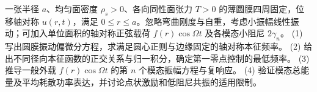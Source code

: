 一张半径 \(a\)、均匀面密度 \(\rho_s>0\)、各向同性面张力 \(T>0\) 的薄圆膜四周固定，位移轴对称 \(u(r,t)\)，满足 \(0\le r\le a\)。忽略弯曲刚度与自重，考虑小振幅线性振动；可加入单位面积的轴对称正弦载荷 \(f(r)\cos\Omega t\) 及各模态小阻尼 \(2\gamma_n\)。
(1) 写出圆膜振动偏微分方程，求满足圆心正则与边缘固定的轴对称本征频率。
(2) 给出不同径向本征函数的正交关系与归一积分，确定第一零点控制的最低频率。
(3) 推导一般外载 \(f(r)\cos\Omega t\) 的第 \(n\) 个模态振幅方程与复响应。
(4) 验证模态总能量及平均耗散功率表达，并讨论点状激励和低阻尼共振的适用限制。
